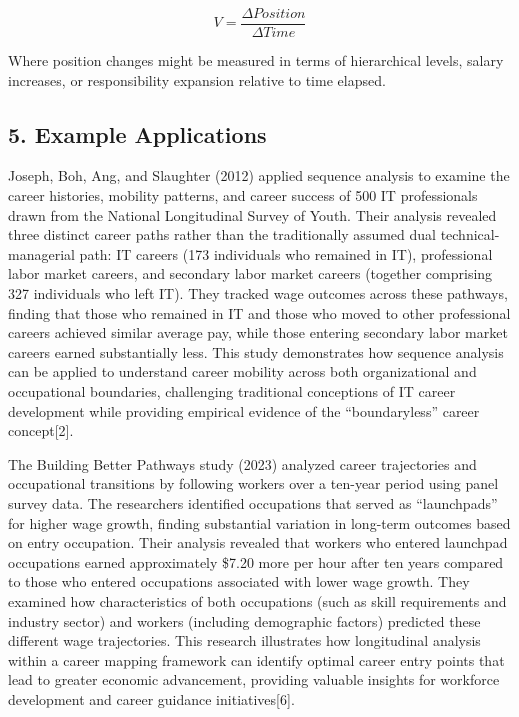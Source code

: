 \documentclass[
  letterpaper,
  DIV=11,
  numbers=noendperiod]{scrartcl}
\begin{document}
\[ V = \frac{\Delta Position}{\Delta Time} \]

Where position changes might be measured in terms of hierarchical
levels, salary increases, or responsibility expansion relative to time
elapsed.

\subsection{5. Example Applications}\label{example-applications}

Joseph, Boh, Ang, and Slaughter (2012) applied sequence analysis to
examine the career histories, mobility patterns, and career success of
500 IT professionals drawn from the National Longitudinal Survey of
Youth. Their analysis revealed three distinct career paths rather than
the traditionally assumed dual technical-managerial path: IT careers
(173 individuals who remained in IT), professional labor market careers,
and secondary labor market careers (together comprising 327 individuals
who left IT). They tracked wage outcomes across these pathways, finding
that those who remained in IT and those who moved to other professional
careers achieved similar average pay, while those entering secondary
labor market careers earned substantially less. This study demonstrates
how sequence analysis can be applied to understand career mobility
across both organizational and occupational boundaries, challenging
traditional conceptions of IT career development while providing
empirical evidence of the ``boundaryless'' career concept{[}2{]}.

The Building Better Pathways study (2023) analyzed career trajectories
and occupational transitions by following workers over a ten-year period
using panel survey data. The researchers identified occupations that
served as ``launchpads'' for higher wage growth, finding substantial
variation in long-term outcomes based on entry occupation. Their
analysis revealed that workers who entered launchpad occupations earned
approximately \$7.20 more per hour after ten years compared to those who
entered occupations associated with lower wage growth. They examined how
characteristics of both occupations (such as skill requirements and
industry sector) and workers (including demographic factors) predicted
these different wage trajectories. This research illustrates how
longitudinal analysis within a career mapping framework can identify
optimal career entry points that lead to greater economic advancement,
providing valuable insights for workforce development and career
guidance initiatives{[}6{]}.
\end{document}
